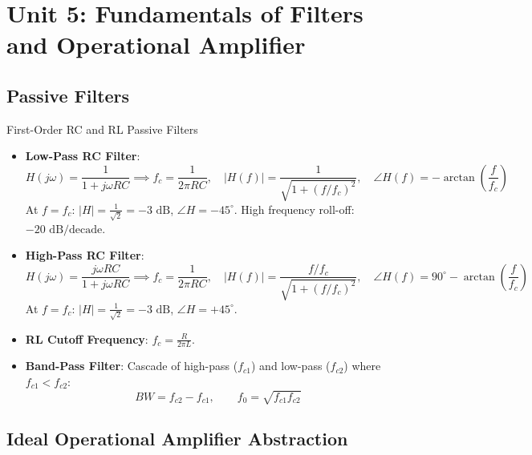 \chapter{Unit 5: Fundamentals of Filters and Operational Amplifier}

\section{Passive Filters}

\begin{formulabox}{First-Order RC and RL Passive Filters}
\begin{itemize}[leftmargin=1.5em]
    \item \textbf{Low-Pass RC Filter}:
    \[ H(j\omega) = \frac{1}{1 + j\omega RC} \implies f_c = \frac{1}{2\pi RC}, \quad |H(f)| = \frac{1}{\sqrt{1 + (f/f_c)^2}}, \quad \angle H(f) = -\arctan\left(\frac{f}{f_c}\right) \]
    At $f = f_c$: $|H| = \frac{1}{\sqrt{2}} = -3\text{ dB}$, $\angle H = -45^\circ$. \quad High frequency roll-off: $-20\text{ dB/decade}$.
    \item \textbf{High-Pass RC Filter}:
    \[ H(j\omega) = \frac{j\omega RC}{1 + j\omega RC} \implies f_c = \frac{1}{2\pi RC}, \quad |H(f)| = \frac{f/f_c}{\sqrt{1 + (f/f_c)^2}}, \quad \angle H(f) = 90^\circ - \arctan\left(\frac{f}{f_c}\right) \]
    At $f = f_c$: $|H| = \frac{1}{\sqrt{2}} = -3\text{ dB}$, $\angle H = +45^\circ$.
    \item \textbf{RL Cutoff Frequency}: $f_c = \frac{R}{2\pi L}$.
    \item \textbf{Band-Pass Filter}: Cascade of high-pass ($f_{c1}$) and low-pass ($f_{c2}$) where $f_{c1} < f_{c2}$:
    \[ BW = f_{c2} - f_{c1}, \qquad f_0 = \sqrt{f_{c1} f_{c2}} \]
\end{itemize}
\end{formulabox}

\section{Ideal Operational Amplifier Abstraction}

